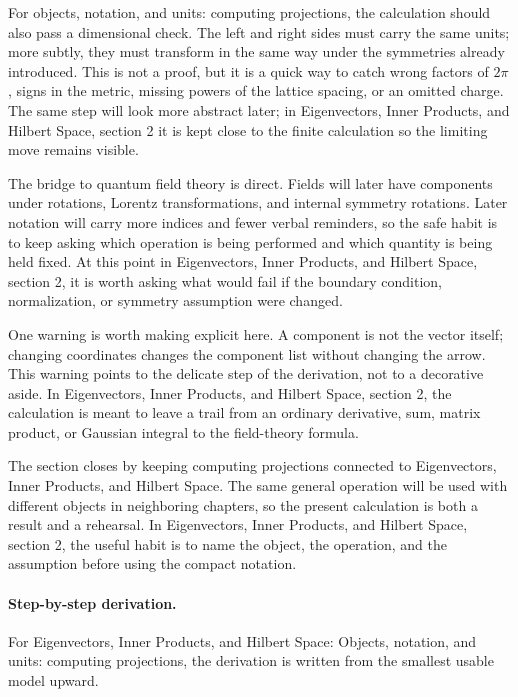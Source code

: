 For objects, notation, and units: computing projections, the calculation should also pass a dimensional check.  The left and right sides must carry the same units; more subtly, they must transform in the same way under the symmetries already introduced.  This is not a proof, but it is a quick way to catch wrong factors of \(2\pi\), signs in the metric, missing powers of the lattice spacing, or an omitted charge.  The same step will look more abstract later; in Eigenvectors, Inner Products, and Hilbert Space, section 2 it is kept close to the finite calculation so the limiting move remains visible.

The bridge to quantum field theory is direct.  Fields will later have components under rotations, Lorentz transformations, and internal symmetry rotations.  Later notation will carry more indices and fewer verbal reminders, so the safe habit is to keep asking which operation is being performed and which quantity is being held fixed.  At this point in Eigenvectors, Inner Products, and Hilbert Space, section 2, it is worth asking what would fail if the boundary condition, normalization, or symmetry assumption were changed.

One warning is worth making explicit here.  A component is not the vector itself; changing coordinates changes the component list without changing the arrow.  This warning points to the delicate step of the derivation, not to a decorative aside.  In Eigenvectors, Inner Products, and Hilbert Space, section 2, the calculation is meant to leave a trail from an ordinary derivative, sum, matrix product, or Gaussian integral to the field-theory formula.

The section closes by keeping computing projections connected to Eigenvectors, Inner Products, and Hilbert Space.  The same general operation will be used with different objects in neighboring chapters, so the present calculation is both a result and a rehearsal.  In Eigenvectors, Inner Products, and Hilbert Space, section 2, the useful habit is to name the object, the operation, and the assumption before using the compact notation.



\paragraph{Step-by-step derivation.}

For Eigenvectors, Inner Products, and Hilbert Space: Objects, notation, and units: computing projections, the derivation is written from the smallest usable model upward.

